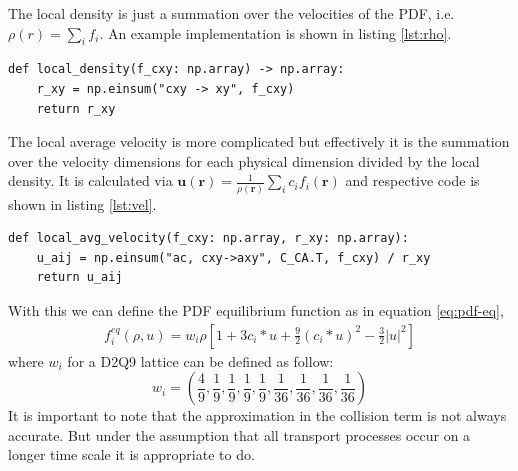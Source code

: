 \documentclass[a4paper,12pt, oneside]{book}
\begin{document}
The local density is just a summation over the velocities of the PDF, i.e. $\rho(r) = \sum_{i} f_{i}$.
An example implementation is shown in listing \ref{lst:rho}.
\begin{center}
\begin{lstlisting}[caption=Implementation of the local density,label=lst:rho, basicstyle=\small]
def local_density(f_cxy: np.array) -> np.array:
    r_xy = np.einsum("cxy -> xy", f_cxy)
    return r_xy
  \end{lstlisting}
\end{center}
The local average velocity is more complicated but effectively it is the summation over the velocity dimensions for each physical dimension divided by the local density.
It is calculated via $\textbf{u}(\textbf{r})=\frac{1}{\rho (\textbf{r})} \sum_{i} c_{i}f_{i}(\textbf{r})$ and respective code is shown in listing \ref{lst:vel}.
\begin{center}
  \begin{lstlisting}[caption=Implementation of the local average velocity.,label=lst:vel, basicstyle=\small]
def local_avg_velocity(f_cxy: np.array, r_xy: np.array):
    u_aij = np.einsum("ac, cxy->axy", C_CA.T, f_cxy) / r_xy
    return u_aij
  \end{lstlisting}
\end{center}
With this we can define the PDF equilibrium function as in equation \ref{eq:pdf-eq},
\begin{equation}
  \label{eq:pdf-eq}
  \begin{aligned}
    f_{i}^{eq} ( \rho , u ) = w_i \rho \left[ 1+3 c_i * u + \frac{9}{2}(c_i * u )^2 - \frac{3}{2} | u |^2 \right]
  \end{aligned}
\end{equation}
where $w_i$ for a D2Q9 lattice can be defined as follow: 
\begin{equation}
w_i = \left( \frac{4}{9}, \frac{1}{9}, \frac{1}{9}, \frac{1}{9}, \frac{1}{9}, \frac{1}{36}, \frac{1}{36}, \frac{1}{36}, \frac{1}{36} \right)
\end{equation}
It is important to note that the approximation in the collision term is not always accurate.
But under the assumption that all transport processes occur on a longer time scale it is appropriate to do.
\end{document}
